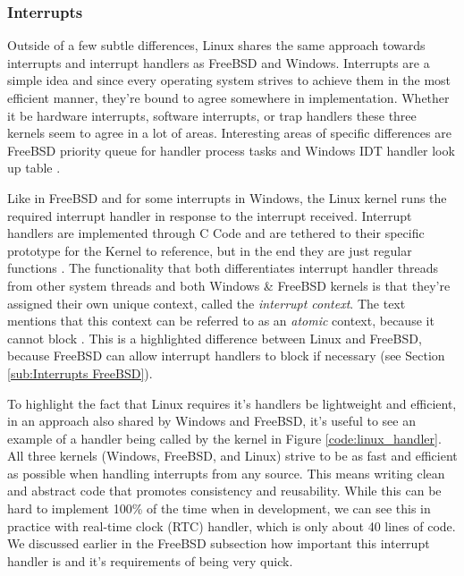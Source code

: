 \documentclass[10pt,draftclsnofoot,onecolumn]{IEEEtran}
\begin{document}
\subsubsection{Interrupts}
\label{sub:Interrupts Linux}
\par Outside of a few subtle differences, Linux shares the same approach towards interrupts and interrupt handlers as FreeBSD and Windows.
Interrupts are a simple idea and since every operating system strives to achieve them in the most efficient manner, they're bound to agree somewhere in implementation.
Whether it be hardware interrupts, software interrupts, or trap handlers these three kernels seem to agree in a lot of areas.
Interesting areas of specific differences are FreeBSD priority queue for handler process tasks and Windows IDT handler look up table \cite{bsd:1} \cite{win:1}.

\par Like in FreeBSD and for some interrupts in Windows, the Linux kernel runs the required interrupt handler in response to the interrupt received.
Interrupt handlers are implemented through C Code and are tethered to their specific prototype for the Kernel to reference, but in the end they are just regular functions \cite{linux:1}.
The functionality that both differentiates interrupt handler threads from other system threads and both Windows \& FreeBSD kernels is that they're assigned their own unique context, called the \textit{interrupt context}.
The text mentions that this context can be referred to as an \textit{atomic} context, because it cannot block \cite{linux:1}.
This is a highlighted difference between Linux and FreeBSD, because FreeBSD can allow interrupt handlers to block if necessary (see Section \ref{sub:Interrupts FreeBSD}).

\par To highlight the fact that Linux requires it's handlers be lightweight and efficient, in an approach also shared by Windows and FreeBSD, it's useful to see an example of a handler being called by the kernel in Figure \ref{code:linux_handler}.
All three kernels (Windows, FreeBSD, and Linux) strive to be as fast and efficient as possible when handling interrupts from any source.
This means writing clean and abstract code that promotes consistency and reusability.
While this can be hard to implement 100\% of the time when in development, we can see this in practice with real-time clock (RTC) handler, which is only about 40 lines of code.
We discussed earlier in the FreeBSD subsection how important this interrupt handler is and it's requirements of being very quick.\\
\end{document}
